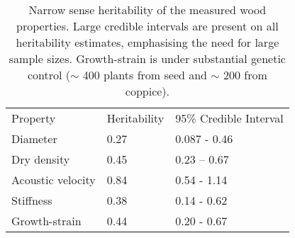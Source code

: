 
\begin{table}
\centering
\caption{Narrow sense heritability of the measured wood properties. Large credible intervals are present on all heritability estimates, emphasising the need for large sample sizes. Growth-strain is under substantial genetic control (\(\sim\) 400 plants from seed and \(\sim\) 200 from coppice).}
\begin{tabular}{lll}
Property          & Heritability & 95\% Credible Interval \\
Diameter          & 0.27         & 0.087 - 0.46           \\
Dry density       & 0.45         & 0.23 – 0.67            \\
Acoustic velocity & 0.84         & 0.54 - 1.14            \\
Stiffness         & 0.38         & 0.14 - 0.62            \\
Growth-strain     & 0.44         & 0.20 - 0.67           
\end{tabular}
\end{table}